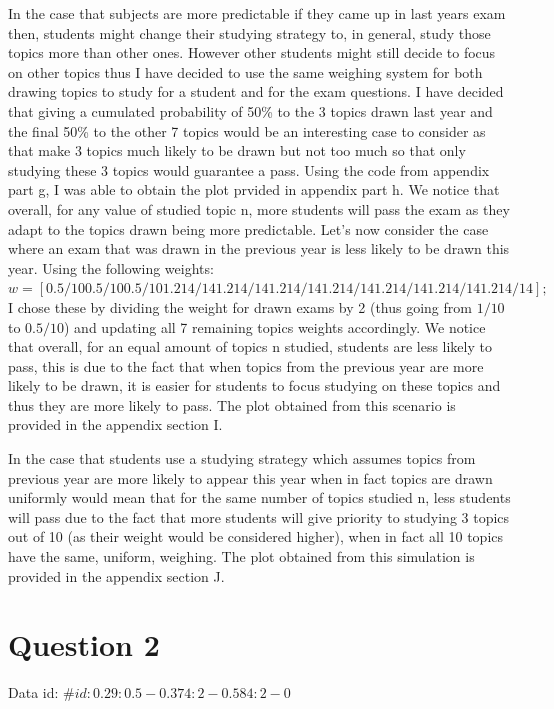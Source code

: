 \documentclass{article}
\begin{document}
In the case that subjects are more predictable if they came up in 
last years exam then, students
might change their studying strategy to, in general, study those topics more than other ones.
However other students might still decide to focus on other topics thus I have decided to use the same
weighing system for both drawing topics to study for a student and for the exam questions.
I have decided that giving a cumulated probability of 50\% to the 3 topics drawn last year and the final
50\% to the other 7 topics would be an interesting case to consider as that make 3 topics much likely
to be drawn but not too much so that only studying these 3 topics would guarantee a pass.
Using the code from appendix part g, I was able to obtain the plot prvided in appendix part h.
We notice that overall, for any value of studied topic n, more students will pass the exam
as they adapt to the topics drawn being more predictable.
Let's now consider the case where an exam that was drawn 
in the previous year is less likely to be drawn this year. Using the following weights: \\
$ w = [0.5/10 0.5/10 0.5/10 1.214/14 1.214/14 1.214/14 1.214/14 1.214/14 1.214/14 1.214/14];$ \\
I chose these by dividing the weight for drawn exams by 2 (thus going from $1/10$ to $0.5/10$) and
updating all 7 remaining topics weights accordingly.
We notice that overall, for an equal amount of topics n studied, students are less likely to pass,
this is due to the fact that when topics from the previous year are more likely to be drawn, 
it is easier for students to focus studying on these topics and thus they are more likely to pass.
The plot obtained from this scenario is provided in the appendix section I.

In the case that students use a studying strategy which assumes topics from previous year are more likely
to appear this year when in fact topics are drawn uniformly would mean that for the same number
of topics studied n, less students will pass due to the fact that more students will give priority to
studying 3 topics out of 10 (as their weight would be considered higher), when in fact all 10 topics
have the same, uniform, weighing. The plot obtained from this simulation is provided in the appendix section J.

\section*{Question 2}
Data id: $\#id:0.29:0.5-0.374:2-0.584:2-0$
\end{document}
